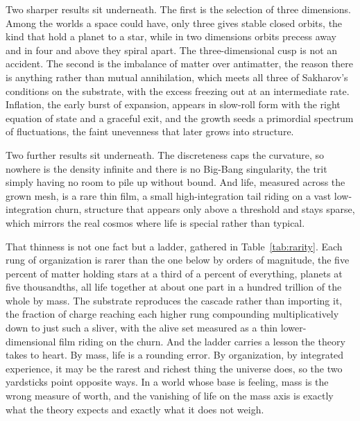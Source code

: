Two sharper results sit underneath. The first is the selection of three dimensions. Among the worlds a space could have, only three gives stable closed orbits, the kind that hold a planet to a star, while in two dimensions orbits precess away and in four and above they spiral apart. The three-dimensional cusp is not an accident. The second is the imbalance of matter over antimatter, the reason there is anything rather than mutual annihilation, which meets all three of Sakharov's conditions on the substrate, with the excess freezing out at an intermediate rate. Inflation, the early burst of expansion, appears in slow-roll form with the right equation of state and a graceful exit, and the growth seeds a primordial spectrum of fluctuations, the faint unevenness that later grows into structure.

Two further results sit underneath. The discreteness caps the curvature, so nowhere is the density infinite and there is no Big-Bang singularity, the trit simply having no room to pile up without bound. And life, measured across the grown mesh, is a rare thin film, a small high-integration tail riding on a vast low-integration churn, structure that appears only above a threshold and stays sparse, which mirrors the real cosmos where life is special rather than typical.

That thinness is not one fact but a ladder, gathered in Table~\ref{tab:rarity}. Each rung of organization is rarer than the one below by orders of magnitude, the five percent of matter holding stars at a third of a percent of everything, planets at five thousandths, all life together at about one part in a hundred trillion of the whole by mass. The substrate reproduces the cascade rather than importing it, the fraction of charge reaching each higher rung compounding multiplicatively down to just such a sliver, with the alive set measured as a thin lower-dimensional film riding on the churn. And the ladder carries a lesson the theory takes to heart. By mass, life is a rounding error. By organization, by integrated experience, it may be the rarest and richest thing the universe does, so the two yardsticks point opposite ways. In a world whose base is feeling, mass is the wrong measure of worth, and the vanishing of life on the mass axis is exactly what the theory expects and exactly what it does not weigh.

